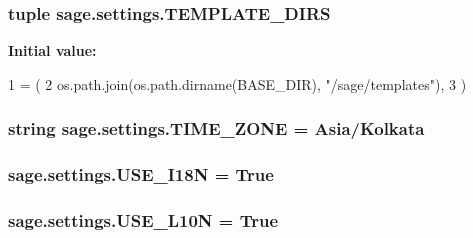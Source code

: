 \subsubsection[{T\+E\+M\+P\+L\+A\+T\+E\+\_\+\+D\+I\+R\+S}]{\setlength{\rightskip}{0pt plus 5cm}tuple sage.\+settings.\+T\+E\+M\+P\+L\+A\+T\+E\+\_\+\+D\+I\+R\+S}\label{namespacesage_1_1settings_addc90c15790d385d304972f1b3098a86}
{\bfseries Initial value\+:}
\begin{DoxyCode}
1 = (
2     os.path.join(os.path.dirname(BASE\_DIR), \textcolor{stringliteral}{"/sage/templates"}),
3 )
\end{DoxyCode}
\hypertarget{namespacesage_1_1settings_a07421ef620becc4c93753901abdf83c0}{}
\subsubsection[{T\+I\+M\+E\+\_\+\+Z\+O\+N\+E}]{\setlength{\rightskip}{0pt plus 5cm}string sage.\+settings.\+T\+I\+M\+E\+\_\+\+Z\+O\+N\+E = \textquotesingle{}Asia/Kolkata\textquotesingle{}}\label{namespacesage_1_1settings_a07421ef620becc4c93753901abdf83c0}
\hypertarget{namespacesage_1_1settings_acf5dd02a352695a98f57bef7679a29af}{}
\subsubsection[{U\+S\+E\+\_\+\+I18\+N}]{\setlength{\rightskip}{0pt plus 5cm}sage.\+settings.\+U\+S\+E\+\_\+\+I18\+N = True}\label{namespacesage_1_1settings_acf5dd02a352695a98f57bef7679a29af}
\hypertarget{namespacesage_1_1settings_a9d0e7298d4688c99e0ee9e965d950de0}{}
\subsubsection[{U\+S\+E\+\_\+\+L10\+N}]{\setlength{\rightskip}{0pt plus 5cm}sage.\+settings.\+U\+S\+E\+\_\+\+L10\+N = True}\label{namespacesage_1_1settings_a9d0e7298d4688c99e0ee9e965d950de0}
\hypertarget{namespacesage_1_1settings_aa385f778cd7bd79cc4c688fec7c101a2}{}
